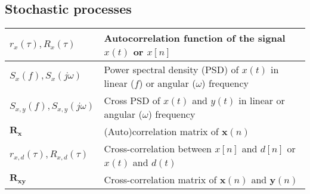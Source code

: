 \documentclass{article}
\begin{document}
\subsection{Stochastic processes}
\begin{xltabular}{\textwidth}{XX}
	\(r_x(\tau), R_x(\tau)\)                                                                                                      & Autocorrelation function of the signal \(x(t)\) or \(x[n]\) \cite{nossekAdaptiveArraySignal2015}                                                                                                                                   \\ \hline
	\(S_x(f), S_x(j\omega)\)                                                                                                      & Power spectral density (PSD) of \(x(t)\) in linear (\(f\)) or angular (\(\omega\)) frequency                                                                                                                                       \\ \hline
	\(S_{x,y}(f), S_{x,y}(j\omega)\)                                                                                              & Cross PSD of \(x(t)\) and \(y(t)\) in linear or angular (\(\omega\)) frequency                                                                                                                                                     \\ \hline
	\(\mathbf{R}_\mathbf{x}\)                                                                                                     & (Auto)correlation matrix of \(\mathbf{x}(n)\)                                                                                                                                                                                      \\ \hline
	\(r_{x,d}(\tau), R_{x,d}(\tau)\)                                                                                              & Cross-correlation between \(x[n]\) and \(d[n]\) or \(x(t)\) and \(d(t)\) \cite{nossekAdaptiveArraySignal2015}                                                                                                                      \\ \hline
	\(\mathbf{R}_\mathbf{xy}\)                                                                                                    & Cross-correlation matrix of \(\mathbf{x}(n)\) and \(\mathbf{y}(n)\)                                                                                                                                                                \\ \hline

\end{xltabular}
\end{document}
